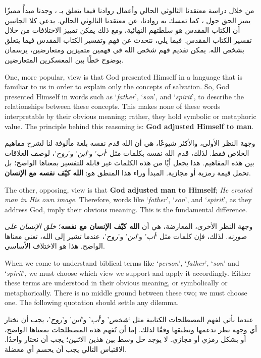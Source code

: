 من خلال دراسة معتقدنا الثالوثي الحالي وأعمال روادنا فيما يتعلق بـ ، وجدنا مبدأً مميزًا يميز الحق حول ، كما تمسك به روادنا، عن معتقدنا الثالوثي الحالي. يدعي كلا الجانبين أن الكتاب المقدس هو سلطتهم النهائية، ومع ذلك يمكن تمييز الاختلافات من خلال تفسير الكتاب المقدس. فيما يلي، نتحدث عن فهم وتفسير الكتاب المقدس فيما يتعلق بشخص الله. يمكن تقديم فهم شخص الله في فهمين متميزين ومتعارضين، يرسمان بوضوح خطًا بين المعسكرين المتعارضين.


One, more popular, view is that God presented Himself in a language that is familiar to us in order to explain only the concepts of salvation. So, God presented Himself in words such as ‘\textit{father}’, ‘\textit{son}’, and ‘\textit{spirit}’, to describe the relationships between these concepts. This makes none of these words interpretable by their obvious meaning; rather, they hold symbolic or metaphoric value. The principle behind this reasoning is: \textbf{God adjusted Himself to man}.


وجهة النظر الأولى، والأكثر شيوعًا، هي أن الله قدم نفسه بلغة مألوفة لنا لشرح مفاهيم الخلاص فقط. لذلك، قدم الله نفسه بكلمات مثل ‘\textit{أب}’ و’\textit{ابن}’ و’\textit{روح}’، لوصف العلاقات بين هذه المفاهيم. هذا يجعل أيًا من هذه الكلمات غير قابلة للتفسير بمعناها الواضح؛ بل تحمل قيمة رمزية أو مجازية. المبدأ وراء هذا المنطق هو: \textbf{الله كيّف نفسه مع الإنسان}.


The other, opposing, view is that \textbf{God adjusted man to Himself}; \textit{He created man in His own image}. Therefore, words like ‘\textit{father}’, ‘\textit{son}’, and ‘\textit{spirit}’, as they address God, imply their obvious meaning. This is the fundamental difference.


وجهة النظر الأخرى، المعارضة، هي أن \textbf{الله كيّف الإنسان مع نفسه}؛ \textit{خلق الإنسان على صورته}. لذلك، فإن كلمات مثل ‘\textit{أب}’ و’\textit{ابن}’ و’\textit{روح}’، عندما تشير إلى الله، تعني معناها الواضح. هذا هو الاختلاف الأساسي.


When we come to understand biblical terms like ‘\textit{person}’, ‘\textit{father}’, ‘\textit{son}’ and ‘\textit{spirit}’, we must choose which view we support and apply it accordingly. Either these terms are understood in their obvious meaning, or symbolically or metaphorically. There is no middle ground between these two; we must choose one. The following quotation should settle any dilemma.


عندما نأتي لفهم المصطلحات الكتابية مثل ‘\textit{شخص}’ و’\textit{أب}’ و’\textit{ابن}’ و’\textit{روح}’، يجب أن نختار أي وجهة نظر ندعمها ونطبقها وفقًا لذلك. إما أن تُفهم هذه المصطلحات بمعناها الواضح، أو بشكل رمزي أو مجازي. لا يوجد حل وسط بين هذين الاثنين؛ يجب أن نختار واحدًا. الاقتباس التالي يجب أن يحسم أي معضلة.


